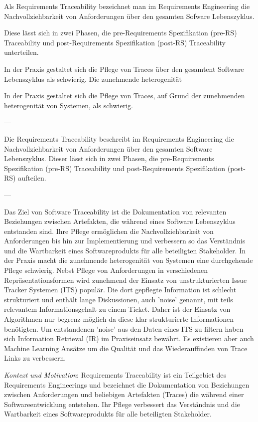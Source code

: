 Als Requirements Traceability bezeichnet man im Requirements Engineering die Nachvollziehbarkeit von Anforderungen über den gesamten Sofware Lebenszyklus.

Diese lässt sich in zwei Phasen, die pre-Requirements Spezifikation (pre-RS) Traceability und post-Requirements Spezifikation (post-RS) Traceability unterteilen. 

In der Praxis gestaltet sich die Pflege von Traces über den gesamtent Software Lebenszyklus als schwierig. Die zunehmende heterogenität 

In der Praxis gestaltet sich die Pflege von Traces, auf Grund der zunehmenden heterogenität von Systemen, als schwierig.

---

Die Requirements Traceability beschreibt im Requirements Engineering die Nachvollziehbarkeit von Anforderungen über den gesamten Software Lebenszyklus. Dieser lässt sich in zwei Phasen, die pre-Requirements Spezifikation (pre-RS) Traceability und post-Requirements Spezifikation (post-RS) aufteilen.

---

Das Ziel von Software Traceability ist die Dokumentation von relevanten Beziehungen zwischen Artefakten, die während eines Software Lebenszyklus entstanden sind. Ihre Pflege ermöglichen die Nachvollziehbarkeit von Anforderungen bis hin zur Implementierung und verbessern so das Verständnis und die Wartbarkeit eines Softwareprodukts für alle beteiligten Stakeholder. In der Praxis macht die zunehmende heterogenität von Systemen eine durchgehende Pflege schwierig. Nebst Pflege von Anforderungen in verschiedenen Repräsentationsformen wird zunehmend der Einsatz von unstrukturierten Issue Tracker Systemen (ITS) populär. Die dort gepflegte Information ist schlecht strukturiert und enthält lange Diskussionen, auch 'noise' genannt, mit teils relevantem Informationsgehalt zu einem Ticket. Daher ist der Einsatz von Algorithmen nur begrenz möglich da diese klar strukturierte Informationen benötigten. Um entstandenen 'noise' aus den Daten eines ITS zu filtern haben sich Information Retrieval (IR) im Praxiseinsatz bewährt. Es existieren aber auch Machine Learning Ansätze um die Qualität und das Wiederauffinden von Trace Links zu verbessern.

\textit{Kontext und Motivation}:
Requirements Traceability ist ein Teilgebiet des Requirements Engineerings und bezeichnet die Dokumentation von Beziehungen zwischen Anforderungen und beliebigen Artefakten (Traces) die während einer Softwareentwicklung entstehen. Ihr Pflege verbessert das Verständnis und die Wartbarkeit eines Softwareprodukts für alle beteiligten Stakeholder.

